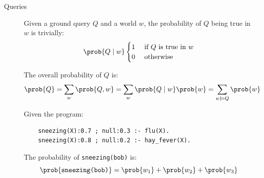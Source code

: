 \begin{description}
    \item[Queries] 
        Given a ground query $Q$ and a world $w$, the probability of $Q$ being true in $w$ is trivially:
        \[ 
            \prob{Q \mid w}
            \begin{cases}
                1 & \text{ if $Q$ is true in $w$}\\
                0 & \text{ otherwise}
            \end{cases} 
        \]

        The overall probability of $Q$ is:
        \[ \prob{Q} = \sum_w \prob{Q, w} = \sum_w \prob{Q \mid w}\prob{w} = \sum_{w \models Q} \prob{w} \]

        \begin{example}
            Given the program:
            \begin{lstlisting}
    sneezing(X):0.7 ; null:0.3 :- flu(X).
    sneezing(X):0.8 ; null:0.2 :- hay_fever(X).
            \end{lstlisting}

            The probability of \texttt{sneezing(bob)} is:
            \[ \prob{\texttt{sneezing(bob)}} = \prob{w_1} + \prob{w_2} + \prob{w_3} \]
        \end{example}
\end{description}